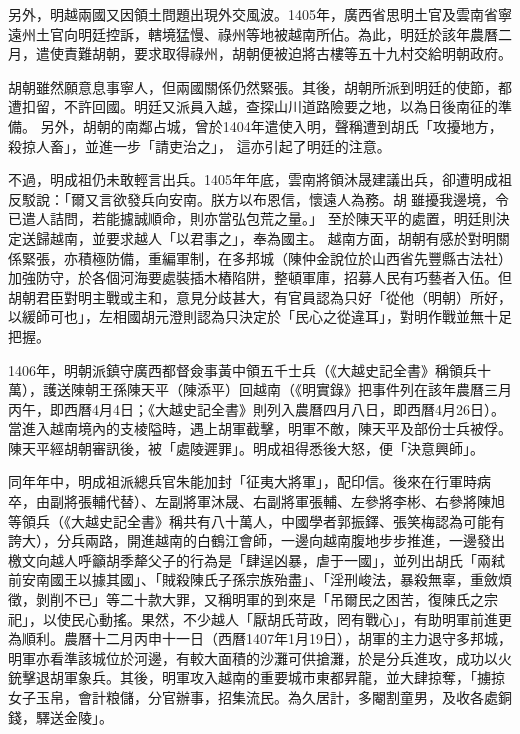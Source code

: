 另外，明越兩國又因領土問題出現外交風波。1405年，廣西省思明土官及雲南省寧遠州土官向明廷控訴，轄境猛慢、祿州等地被越南所佔。為此，明廷於該年農曆二月，遣使責難胡朝，要求取得祿州，胡朝便被迫將古樓等五十九村交給明朝政府。

胡朝雖然願意息事寧人，但兩國關係仍然緊張。其後，胡朝所派到明廷的使節，都遭扣留，不許回國。明廷又派員入越，查探山川道路險要之地，以為日後南征的準備。 另外，胡朝的南鄰占城，曾於1404年遣使入明，聲稱遭到胡氏「攻擾地方，殺掠人畜」，並進一步「請吏治之」， 這亦引起了明廷的注意。

不過，明成祖仍未敢輕言出兵。1405年年底，雲南將領沐晟建議出兵，卻遭明成祖反駁說：「爾又言欲發兵向安南。朕方以布恩信，懷遠人為務。胡𡗨雖擾我邊境，令已遣人詰問，若能攄誠順命，則亦當弘包荒之量。」 至於陳天平的處置，明廷則決定送歸越南，並要求越人「以君事之」，奉為國主。 越南方面，胡朝有感於對明關係緊張，亦積極防備，重編軍制，在多邦城（陳仲金說位於山西省先豐縣古法社）加強防守，於各個河海要處裝插木樁陷阱，整頓軍庫，招募人民有巧藝者入伍。但胡朝君臣對明主戰或主和，意見分歧甚大，有官員認為只好「從他（明朝）所好，以緩師可也」，左相國胡元澄則認為只決定於「民心之從違耳」，對明作戰並無十足把握。

1406年，明朝派鎮守廣西都督僉事黃中領五千士兵（《大越史記全書》稱領兵十萬），護送陳朝王孫陳天平（陳添平）回越南（《明實錄》把事件列在該年農曆三月丙午，即西曆4月4日；《大越史記全書》則列入農曆四月八日，即西曆4月26日）。當進入越南境內的支棱隘時，遇上胡軍截擊，明軍不敵，陳天平及部份士兵被俘。陳天平經胡朝審訊後，被「處陵遲罪」。明成祖得悉後大怒，便「決意興師」。

同年年中，明成祖派總兵官朱能加封「征夷大將軍」，配印信。後來在行軍時病卒，由副將張輔代替）、左副將軍沐晟、右副將軍張輔、左參將李彬、右參將陳旭等領兵（《大越史記全書》稱共有八十萬人，中國學者郭振鐸、張笑梅認為可能有誇大），分兵兩路，開進越南的白鶴江會師，一邊向越南腹地步步推進，一邊發出檄文向越人呼籲胡季犛父子的行為是「肆逞凶暴，虐于一國」，並列出胡氏「兩弒前安南國王以據其國」、「賊殺陳氏子孫宗族殆盡」、「淫刑峻法，暴殺無辜，重斂煩徵，剝削不已」等二十款大罪，又稱明軍的到來是「吊爾民之困苦，復陳氏之宗祀」，以使民心動搖。果然，不少越人「厭胡氏苛政，罔有戰心」，有助明軍前進更為順利。農曆十二月丙申十一日（西曆1407年1月19日），胡軍的主力退守多邦城，明軍亦看準該城位於河邊，有較大面積的沙灘可供搶灘，於是分兵進攻，成功以火銃擊退胡軍象兵。其後，明軍攻入越南的重要城市東都昇龍，並大肆掠奪，「擄掠女子玉帛，會計粮儲，分官辦事，招集流民。為久居計，多閹割童男，及收各處銅錢，驛送金陵」。

